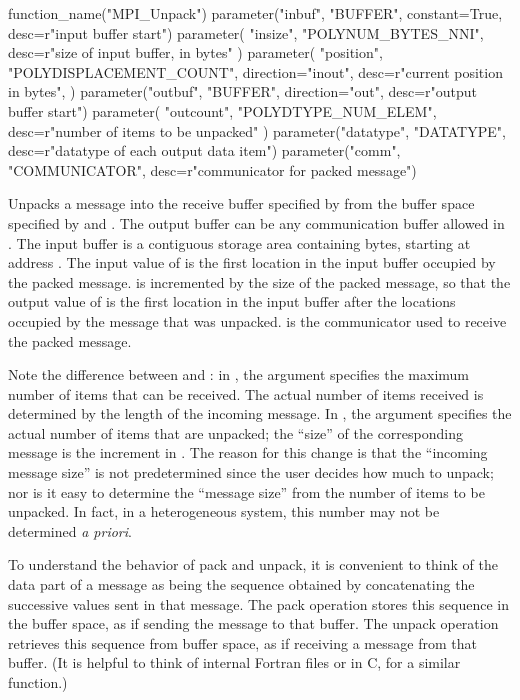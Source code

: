 \begin{mpi-binding}
    function_name("MPI_Unpack")
    parameter("inbuf", "BUFFER", constant=True, desc=r"input buffer start")
    parameter(
        "insize", "POLYNUM_BYTES_NNI", desc=r"size of input buffer, in bytes"
    )
    parameter(
        "position",
        "POLYDISPLACEMENT_COUNT",
        direction="inout",
        desc=r"current position in bytes",
    )
    parameter("outbuf", "BUFFER", direction="out", desc=r"output buffer start")
    parameter(
        "outcount", "POLYDTYPE_NUM_ELEM", desc=r"number of items to be unpacked"
    )
    parameter("datatype", "DATATYPE", desc=r"datatype of each output data item")
    parameter("comm", "COMMUNICATOR", desc=r"communicator for packed message")
\end{mpi-binding}

Unpacks a message into the receive buffer specified by  from the buffer
space specified by  and .  The output buffer can
be any communication buffer allowed in .  The input
buffer is a contiguous storage area containing  bytes,
starting at address .
The input value of  is the first location in
the input buffer occupied by the packed message.
 is incremented
by the size of the packed message, so that the output value of
 is the first location in the input buffer
after the locations occupied by the message that was unpacked.
 is the communicator used to receive the packed message.

\begin{users}
Note the difference between  and :  in
, the  argument specifies the maximum
number of
items that can be received.  The actual number of items received is determined
by the length of the incoming message.  In , the
 argument specifies the actual number
of items that are unpacked;
the ``size'' of the corresponding message is the increment in
.
The reason for this change is that the ``incoming message size'' is not
predetermined since the user decides how much to unpack; nor is it easy to
determine
the ``message size'' from the number of items to be unpacked.  In fact, in a
heterogeneous system, this number may not be determined \emph{a priori}.
\end{users}

To understand the behavior of pack and unpack, it is convenient to think of the
data part of a message as being the sequence obtained by concatenating the
successive values sent in that message.   The pack operation stores this
sequence in the buffer space, as if sending the message to that buffer.  The
unpack operation retrieves this sequence from buffer space, as if receiving a
message from that buffer.  (It is helpful to think of internal Fortran files or
 in C, for a similar function.)

